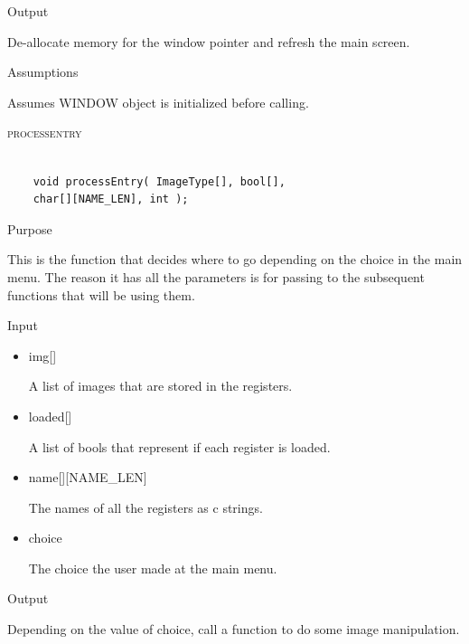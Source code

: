 \documentclass[pdftex, 11pt]{article}
\begin{document}
\begin{description}
\begin{description}
			\item{Output}

				De-allocate memory for the window pointer and refresh the
				main screen.

			\item{Assumptions}

				Assumes WINDOW object is initialized before calling.


		\end{description}


	\item{\textsc{processentry}}

		\begin{lstlisting}

	void processEntry( ImageType[], bool[], 
	char[][NAME_LEN], int );
		\end{lstlisting}

		\begin{description}
			\item{Purpose}

				This is the function that decides where to go depending on the choice in the
				main menu.  The reason it has all the parameters is for passing to the
				subsequent functions that will be using them.

			\item{Input}

				\begin{itemize}

					\item{img[]}

						A list of images that are stored in the registers.

					\item{loaded[]}

						A list of bools that represent if each register is loaded.

					\item{name[][NAME\_LEN]}

						The names of all the registers as c strings.

					\item{choice}
				
						The choice the user made at the main menu.

				\end{itemize}

			\item{Output}

				Depending on the value of choice, call a function to do some image
				manipulation.


\end{description}
\end{description}
\end{document}
